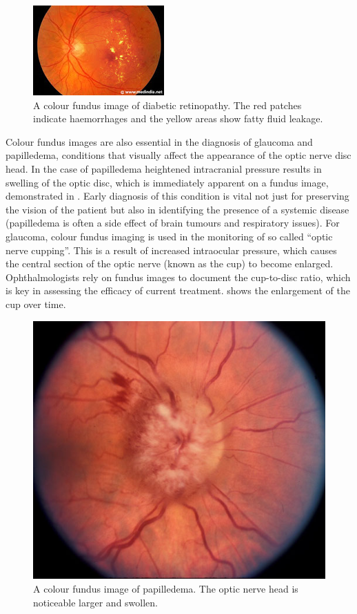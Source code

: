 \begin{figure}[H]
\centering
\includegraphics{figures/diabeticretinopathy}
\caption{A colour fundus image of diabetic retinopathy. The red patches indicate haemorrhages and the yellow areas show fatty fluid leakage.\cite{silva2014potential}}
\label{fig:dr}
   \end{figure}

Colour fundus images are also essential in the diagnosis of glaucoma and
papilledema, conditions that visually affect the appearance of the optic
nerve disc head.  In the case of papilledema heightened intracranial pressure
results in swelling of the optic disc, which is immediately apparent on a
fundus image, demonstrated in . Early diagnosis of this condition
is vital not just for preserving the vision of the patient but also in identifying
the presence of a systemic disease (papilledema is often a side effect of brain
tumours and respiratory issues). For glaucoma, colour fundus imaging is used in
the monitoring of so called \enquote{optic nerve cupping}. This is a result of increased
intraocular pressure, which causes the central section of the optic nerve (known
as the cup) to become enlarged. Ophthalmologists rely on fundus images to document the cup-to-disc ratio, which is key in assessing the efficacy of
current treatment.
 shows the enlargement of the cup over time.

\begin{figure}[H]
\centering
\includegraphics{figures/papilledema}
\caption{A colour fundus image of papilledema. The optic nerve head is noticeable larger and swollen.\cite{7_burnett_hodd_2012}}
\label{fig:pap}
   \end{figure}

